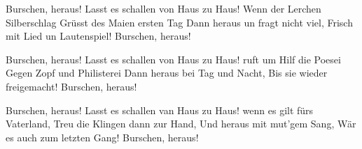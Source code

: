\footnotemark [
ititle={Burschen, heraus!}]


\beginverse
Burschen, heraus!
Lasst es schallen von Haus zu Haus!
Wenn der Lerchen Silberschlag
Grüsst des Maien ersten Tag
Dann heraus un fragt nicht viel,
Frisch mit Lied un Lautenspiel!
Burschen, heraus!
\endverse

\beginverse
Burschen, heraus!
Lasst es schallen von Haus zu Haus!
ruft um Hilf die Poesei
Gegen Zopf und Philisterei
Dann heraus bei Tag und Nacht,
Bis sie wieder freigemacht!
Burschen, heraus!
\endverse

\beginverse
Burschen, heraus!
Lasst es schallen van Haus zu Haus!
wenn es gilt fürs Vaterland,
Treu die Klingen dann zur Hand,
Und heraus mit mut'gem Sang,
Wär es auch zum letzten Gang!
Burschen, heraus!
\endverse
\endsong
